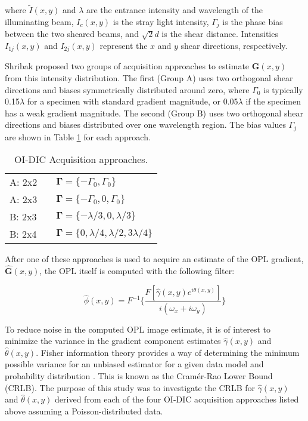 \documentclass[aps, secnumarabic, amssymb, notitlepage]{article}
\begin{document}
\noindent where $\tilde{I}(x,y)$ and $\lambda$ are the entrance intensity and wavelength of the illuminating beam, $I_c(x,y)$ is the stray light intensity, $\Gamma_j$ is the phase bias between the two sheared beams, and $\sqrt{2}d$ is the shear distance. Intensities $I_{1j}(x,y)$ and $I_{2j}(x,y)$ represent the $x$ and $y$ shear directions, respectively.

Shribak proposed two groups of acquisition approaches to estimate $\bm{G}(x,y)$ from this intensity distribution. The first (Group A) uses two orthogonal shear directions and biases symmetrically distributed around zero, where $\Gamma_0$ is typically 0.15$\lambda$ for a specimen with standard gradient magnitude, or 0.05$\lambda$ if the specimen has a weak gradient magnitude. The second (Group B) uses two orthogonal shear directions and biases distributed over one wavelength region. The bias values $\Gamma_j$ are shown in Table \ref{tab:approaches} for each approach. 

\begin{table}[H]
  \centering
  \caption{OI-DIC Acquisition approaches. }
  \begin{tabular}{l c l}
    \hline
    \hline
    A: 2x2 &    & $\bm{\Gamma} = \{-\Gamma_0, \Gamma_0\}$ \\
    A: 2x3 &    & $\bm{\Gamma} = \{-\Gamma_0, 0, \Gamma_0\}$\\
    B: 2x3 &    & $\bm{\Gamma} = \{-\lambda/3, 0, \lambda/3\}$\\
    B: 2x4 &    & $\bm{\Gamma} = \{0, \lambda/4, \lambda/2, 3\lambda/4\}$\\
    \hline
    \hline
  \end{tabular}
  \label{tab:approaches}
\end{table}

After one of these approaches is used to acquire an estimate of the OPL gradient, $\hat{\bm{G}}(x,y)$, the OPL itself is computed with the following filter:

\begin{equation}
  \hat{\phi}(x,y) = F^{-1}\Bigg\{ \frac{F[\hat{\gamma}(x,y)e^{i\hat{\theta}(x,y)}]}{i(\omega_x + i\omega_y)}\Bigg\}
  \label{eq:OPL}
\end{equation}

To reduce noise in the computed OPL image estimate, it is of interest to minimize the variance in the gradient component estimates $\hat{\gamma}(x,y)$ and $\hat{\theta}(x,y)$. Fisher information theory provides a way of determining the minimum possible variance for an unbiased estimator for a given data model and probability distribution \cite{fisher}. This is known as the Cram\'er-Rao Lower Bound (CRLB). The purpose of this study was to investigate the CRLB for $\hat{\gamma}(x,y)$ and $\hat{\theta}(x,y)$ derived from each of the four OI-DIC acquisition approaches listed above assuming a Poisson-distributed data.
\end{document}
